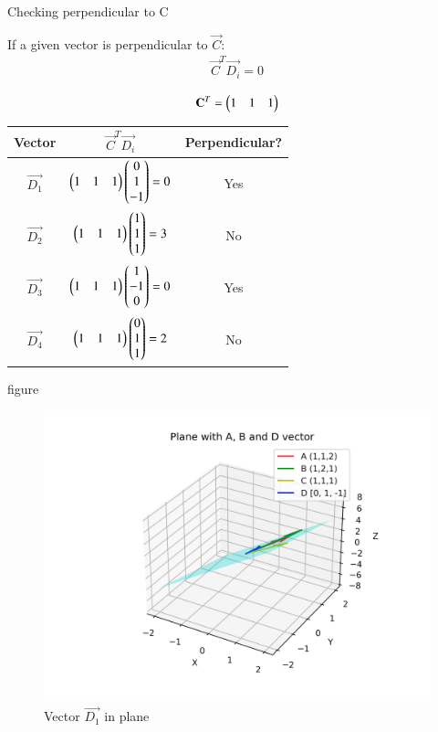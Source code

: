 \documentclass{beamer}
\begin{document}
\begin{frame}{ Checking perpendicular to C}


If a given vector is perpendicular to $\vec{C}$:
\begin{align}
    {\vec{C}}^T \vec{D_i} = 0
\end{align}

\begin{align}
    {\mathbf{C}}^T = \begin{pmatrix}1 & 1 & 1\end{pmatrix}
\end{align}
\end{frame}
\begin{frame}
\begin{center}
\begin{tabular}{|c|c|c|}
\hline
Vector & ${\vec{C}}^T\vec{D_i}$ & Perpendicular? \\ \hline
$\vec{D_1}$ & $\begin{pmatrix}1 & 1 & 1\end{pmatrix}\begin{pmatrix}0 \\ 1 \\ -1\end{pmatrix} = 0$ & Yes \\ \hline
$\vec{D_2}$ & $\begin{pmatrix}1 & 1 & 1\end{pmatrix}\begin{pmatrix}1 \\ 1 \\ 1\end{pmatrix} = 3$  & No  \\ \hline
$\vec{D_3}$ & $\begin{pmatrix}1 & 1 & 1\end{pmatrix}\begin{pmatrix}1 \\ -1 \\ 0\end{pmatrix} = 0$ & Yes \\ \hline
$\vec{D_4}$ & $\begin{pmatrix}1 & 1 & 1\end{pmatrix}\begin{pmatrix}0 \\ 1 \\ 1\end{pmatrix} = 2$  & No  \\ \hline
\end{tabular}
\end{center}

\end{frame}
\begin{frame}{figure}
\begin{figure}[H]
    \centering
    \includegraphics[width=0.6\linewidth]{figures/plane_1.png}
    \caption{Vector $\vec{D_1}$ in plane}
\end{figure}
\end{frame}
\end{document}
